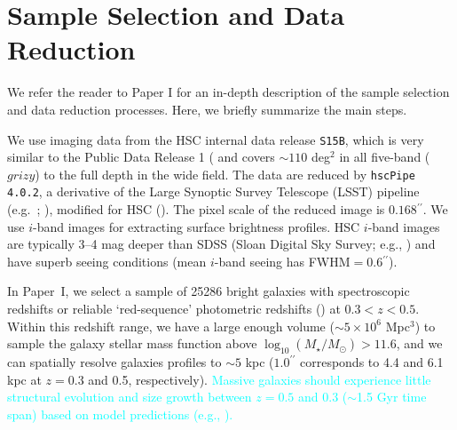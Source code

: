 \documentclass[a4paper,fleqn,usenatbib]{mnras}
\def\arcsec{{\prime\prime}}
\def\asec{$^{\prime\prime}$}
\def\logms{{$\log_{10} (M_{\star}/M_{\odot})$}}
\newcommand{\song}[1]{\textcolor{cyan}{#1}}
\begin{document}
\section{Sample Selection and Data Reduction}
    \label{sec:data}
    
    We refer the reader to Paper I for an in-depth description of the sample selection 
    and data reduction processes. 
    Here, we briefly summarize the main steps.
    
    We use imaging data from the HSC internal data release 
    \texttt{S15B}, which is very similar to the Public Data Release 1 
    (\citealt{HSC-DR1} and covers ${\sim} 110$ deg$^2$ in all five-band ($grizy$) to 
    the full depth in the wide field. 
    The data are reduced by \texttt{hscPipe 4.0.2}, a derivative of the 
    Large Synoptic Survey Telescope (LSST) pipeline (e.g.\ \citealt{Juric2015}; 
    \citealt{Axelrod2010}), modified for HSC (\citealt{HSC-PIPE}).
    The pixel scale of the reduced image is $0.168$\asec{}.
    We use $i$-band images for extracting surface brightness profiles. 
    HSC $i$-band images are typically 3--4 mag deeper than SDSS 
    (Sloan Digital Sky Survey; e.g., \citealt{SDSS-DR7, SDSS-DR8, SDSS-DR12})  
    and have superb seeing conditions (mean $i$-band seeing has FWHM$=0.6$\asec{}).
    
    In Paper~I, we select a sample of 25286 bright galaxies with spectroscopic 
    redshifts or reliable `red-sequence' photometric redshifts (\citealt{Rykoff2014}) 
    at $0.3<z<0.5$. 
    Within this redshift range, we have a large enough volume 
    ($\sim5\times 10^6$ Mpc$^3$) to sample the galaxy stellar mass function above 
    \logms$>11.6$, and we can spatially resolve galaxies profiles to $\sim 5$ kpc 
    ($1.0^{\arcsec}$ corresponds to 4.4 and 6.1 kpc at $z=0.3$ and 0.5, respectively). 
    \song{
    Massive galaxies should experience little structural evolution and 
    size growth between $z=0.5$ and 0.3 ($\sim$1.5 Gyr time span) 
    based on model predictions (e.g., \citealt{Shankar2015}).
    }
    
\end{document}
